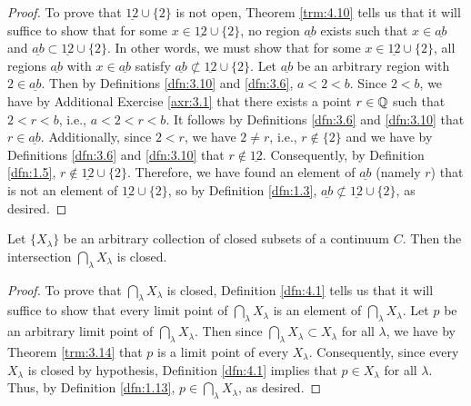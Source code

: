\documentclass[../main.tex]{subfiles}
\begin{document}
\begin{exercise}
\begin{proof}
        To prove that $\underline{12}\cup\{2\}$ is not open, Theorem \ref{trm:4.10} tells us that it will suffice to show that for some $x\in\underline{12}\cup\{2\}$, no region $\underline{ab}$ exists such that $x\in\underline{ab}$ and $\underline{ab}\subset\underline{12}\cup\{2\}$. In other words, we must show that for some $x\in\underline{12}\cup\{2\}$, all regions $\underline{ab}$ with $x\in\underline{ab}$ satisfy $\underline{ab}\not\subset\underline{12}\cup\{2\}$. Let $\underline{ab}$ be an arbitrary region with $2\in\underline{ab}$. Then by Definitions \ref{dfn:3.10} and \ref{dfn:3.6}, $a<2<b$. Since $2<b$, we have by Additional Exercise \ref{axr:3.1} that there exists a point $r\in\mathbb{Q}$ such that $2<r<b$, i.e., $a<2<r<b$. It follows by Definitions \ref{dfn:3.6} and \ref{dfn:3.10} that $r\in\underline{ab}$. Additionally, since $2<r$, we have $2\neq r$, i.e., $r\notin\{2\}$ and we have by Definitions \ref{dfn:3.6} and \ref{dfn:3.10} that $r\notin\underline{12}$. Consequently, by Definition \ref{dfn:1.5}, $r\notin\underline{12}\cup\{2\}$. Therefore, we have found an element of $\underline{ab}$ (namely $r$) that is not an element of $\underline{12}\cup\{2\}$, so by Definition \ref{dfn:1.3}, $\underline{ab}\not\subset\underline{12}\cup\{2\}$, as desired.
    \end{proof}
\end{exercise}

\begin{theorem}\label{trm:4.16}
    Let $\{X_\lambda\}$ be an arbitrary collection of closed subsets of a continuum $C$. Then the intersection $\bigcap_\lambda X_\lambda$ is closed.
    \begin{proof}
        To prove that $\bigcap_\lambda X_\lambda$ is closed, Definition \ref{dfn:4.1} tells us that it will suffice to show that every limit point of $\bigcap_\lambda X_\lambda$ is an element of $\bigcap_\lambda X_\lambda$. Let $p$ be an arbitrary limit point of $\bigcap_\lambda X_\lambda$. Then since $\bigcap_\lambda X_\lambda\subset X_\lambda$ for all $\lambda$, we have by Theorem \ref{trm:3.14} that $p$ is a limit point of every $X_\lambda$. Consequently, since every $X_\lambda$ is closed by hypothesis, Definition \ref{dfn:4.1} implies that $p\in X_\lambda$ for all $\lambda$. Thus, by Definition \ref{dfn:1.13}, $p\in\bigcap_\lambda X_\lambda$, as desired.
    \end{proof}
\end{theorem}
\end{document}
